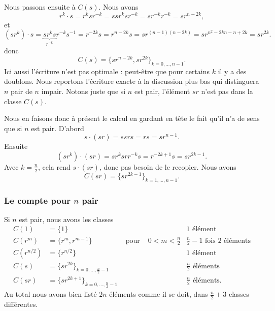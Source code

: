 Nous passons ensuite à \( C(s)\). Nous avons
\begin{equation}
    r^k\cdot s=r^ksr^{-k}=ssr^ksr^{-k}=sr^{-k}r^{-k}=sr^{n-2k},
\end{equation}
et
\begin{equation}
    (sr^k)\cdot s=\underbrace{sr^ks}_{r^{-k}}r^{-k}s^{-1}=r^{-2k}s=r^{n-2k}s=sr^{(n-1)(n-2k)}=sr^{n^2-2kn-n+2k}=sr^{2k}.
\end{equation}
donc
\begin{equation}
    C(s)=\{ sr^{n-2k},sr^{2k} \}_{k=0,\ldots, n-1}.
\end{equation}
Ici aussi l'écriture n'est pas optimale : peut-être que pour certains \( k\) il y a des doublons. Nous reportons l'écriture exacte à la discussion plus bas qui distinguera \( n\) pair de \( n\) impair. Notons juste que si \( n\) est pair, l'élément \( sr\) n'est pas dans la classe \( C(s)\).

Nous en faisons donc à présent le calcul en gardant en tête le fait qu'il n'a de sens que si \( n\) est pair. D'abord
\begin{equation}
    s\cdot (sr)=ssrs=rs=sr^{n-1}.
\end{equation}
Ensuite
\begin{equation}
    (sr^k)\cdot (sr)=sr^ksrr^{-k}s=r^{-2k+1}s=sr^{2k-1}.
\end{equation}
Avec \( k=\frac{ n }{2}\), cela rend \( s\cdot (sr)\), donc pas besoin de le recopier. Nous avons
\begin{equation}
    C(sr)=\{ sr^{2k-1} \}_{k=1,\ldots, n-1}.
\end{equation}

\subsubsection{Le compte pour $ n$ pair}
\label{SubsubsecROVmHuM}

Si \( n\) est pair, nous avons les classes
\begin{subequations}
    \begin{align}
        C(1)&=\{ 1 \}       &&& 1\text{ élément}\\
        C(r^m)&=\{ r^m,r^{m-1} \}&\text{ pour }&0<m<\frac{ n }{2}   & \frac{ n }{2}-1\text{ fois } 2\text{ éléments}\\
        C(r^{n/2})&=\{ r^{n/2} \}   &&&  1\text{ élément}\\ 
        C(s)&=\{ sr^{2k} \}_{k=0,\ldots, \frac{ n }{2}-1} &&&  \frac{ n }{2}\text{ éléments}\\
        C(sr)&=\{ sr^{2k+1} \}_{k=0,\ldots, \frac{ n }{2}-1} &&&  \frac{ n }{2}\text{ éléments}.
    \end{align}
\end{subequations}
Au total nous avons bien listé \( 2n\) éléments comme il se doit, dans \(  \frac{ n }{2}+3\) classes différentes.

